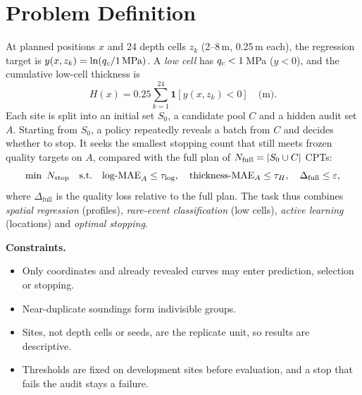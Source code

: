 \section{Problem Definition}

At planned positions $x$ and 24 depth cells $z_k$ (2--8\,m, 0.25\,m each), the regression target is
$y(x,z_k)=\ln(q_c/1\,\text{MPa})$. A \emph{low cell} has $q_c<1$\,MPa ($y<0$), and the cumulative low-cell
thickness is
\begin{equation}
H(x) = 0.25\sum_{k=1}^{24}\mathbf{1}\left[y(x,z_k)<0\right]\quad\text{(m)}.
\end{equation}
Each site is split into an initial set $S_0$, a candidate pool $C$ and a hidden audit set $A$. Starting from
$S_0$, a policy repeatedly reveals a batch from $C$ and decides whether to stop. It seeks the smallest
stopping count \Nstop{} that still meets frozen quality targets on $A$, compared with the full plan of
$N_{\text{full}}=|S_0\cup C|$ CPTs:
\begin{equation}
\min\ N_{\text{stop}}\quad\text{s.t.}\quad \text{log-MAE}_A\le\tau_{\log},\quad \text{thickness-MAE}_A\le\tau_H,\quad
\Delta_{\text{full}}\le\varepsilon,
\end{equation}
where $\Delta_{\text{full}}$ is the quality loss relative to the full plan. The task thus combines \emph{spatial regression} (profiles), \emph{rare-event classification} (low cells),
\emph{active learning} (locations) and \emph{optimal stopping}.

\textbf{Constraints.}
\begin{itemize}
\item Only coordinates and already revealed curves may enter prediction, selection or stopping.
\item Near-duplicate soundings form indivisible groups.
\item Sites, not depth cells or seeds, are the replicate unit, so results are descriptive.
\item Thresholds are fixed on development sites before evaluation, and a stop that fails the audit stays a
  failure.
\end{itemize}
